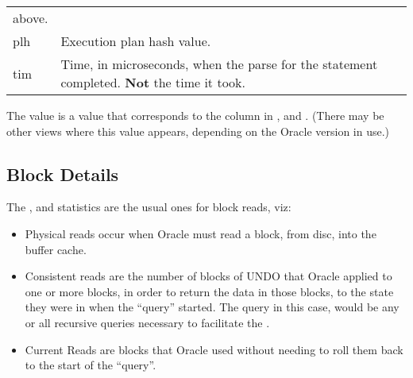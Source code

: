 \begin{longtable}[]{@{}l|l@{}}
\begin{minipage}[t]{0.65\columnwidth}
above.\strut
\end{minipage}\tabularnewline
\begin{minipage}[t]{0.14\columnwidth}\raggedright\strut
plh\strut
\end{minipage} & \begin{minipage}[t]{0.65\columnwidth}\raggedright\strut
Execution plan hash value.\strut
\end{minipage}\tabularnewline
\begin{minipage}[t]{0.14\columnwidth}\raggedright\strut
tim\strut
\end{minipage} & \begin{minipage}[t]{0.65\columnwidth}\raggedright\strut
Time, in microseconds, when the parse for the statement completed.
\textbf{Not} the time it took.\strut
\end{minipage}\tabularnewline
\bottomrule
\end{longtable}

The  value is a value that corresponds to the column  in ,  and . (There may be other views where this value appears, depending on the Oracle version in use.)

\subsection*{Block Details}\label{block-details}


The ,  and  statistics are the usual ones for block reads, viz:

\begin{itemize}
\tightlist
\item
  Physical reads occur when Oracle must read a block, from disc, into the buffer cache.
\item
  Consistent reads are the number of blocks of UNDO that Oracle applied to one or more blocks, in order to return the data in those blocks, to the state they were in when the ``query'' started. The query in this case, would be any or all recursive queries necessary to facilitate the .
\item
  Current Reads are blocks that Oracle used without needing to roll them back to the start of the ``query''.
\end{itemize}

